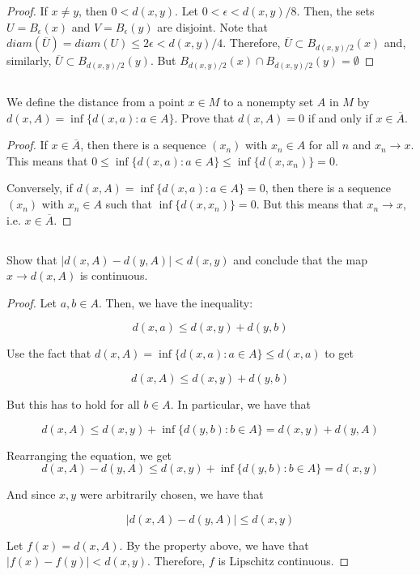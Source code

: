 \begin{proof}
If $x \neq y$, then $0 < d(x, y)$. Let $0 < \epsilon < d(x,y) / 8$. Then, the sets $U = B_\epsilon(x)$ and $V = B_\epsilon(y)$ are disjoint. Note that $diam(\overline{U}) = diam(U) \leq 2 \epsilon < d(x,y) / 4$. Therefore, $\overline{U} \subset B_{d(x,y)/2}(x)$ and, similarly, $\overline{U} \subset B_{d(x,y)/2}(y)$. But $B_{d(x,y)/2}(x) \cap B_{d(x,y)/2}(y) = \emptyset$
\end{proof}


\subsection{} We  define the distance from a point $x \in M$ to  a nonempty set $A$ in $M$ by $d(x, A) = \inf\{d(x , a) : a \in A\}$. Prove that $d(x , A) = 0$ if and only if $x \in \overline{A}$. 

\begin{proof}
If $x \in \overline{A}$, then there is a sequence $(x_n)$ with $x_n \in A$ for all $n$ and $x_n \rightarrow x$. This means that $0 \leq \inf\{d(x, a): a \in A\} \leq \inf\{d(x, x_n)\} = 0$.

Conversely, if $d(x , A) = \inf\{d(x , a) : a \in A\} = 0$, then there is a sequence $(x_n)$ with $x_n \in A$ such that $\inf\{d(x , x_n)\} = 0$. But this means that $x_n \rightarrow x$, i.e. $x \in \overline{A}$.
\end{proof}





\subsection{} Show that $|d(x, A)- d(y, A)| < d(x, y)$ and conclude that the map $x \rightarrow d(x , A)$ is continuous.

\begin{proof}

Let $a,b \in A$. Then, we have the inequality:

$$ d(x, a) \leq d(x, y) + d(y, b) $$

Use the fact that $d(x, A) = \inf\{d(x, a) : a \in A\} \leq d(x, a)$ to get

$$ d(x, A) \leq d(x, y) + d(y, b) $$

But this has to hold for all $b \in A$. In particular, we have that 

$$ d(x, A) \leq d(x, y) + \inf\{d(y,b) : b\in A\} = d(x,y) + d(y,A) $$

Rearranging the equation, we get
$$ d(x, A) - d(y,A) \leq d(x, y) + \inf\{d(y,b) : b\in A\} = d(x,y) $$

And since $x,y$ were arbitrarily chosen, we have that

$$ |d(x, A) - d(y,A)| \leq d(x,y) $$


Let $f(x) = d(x,A)$. By the property above, we have that $|f(x) - f(y)| < d(x,y)$. Therefore, $f$ is Lipschitz continuous.
\end{proof}



